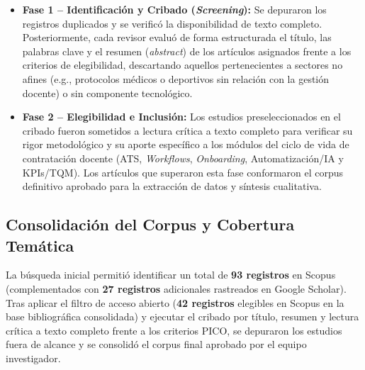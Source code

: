 \documentclass[conference]{IEEEtran}
\begin{document}
\begin{itemize}
    \item \textbf{Fase 1 -- Identificación y Cribado (\textit{Screening}):} Se depuraron los registros duplicados y se verificó la disponibilidad de texto completo. Posteriormente, cada revisor evaluó de forma estructurada el título, las palabras clave y el resumen (\textit{abstract}) de los artículos asignados frente a los criterios de elegibilidad, descartando aquellos pertenecientes a sectores no afines (e.g., protocolos médicos o deportivos sin relación con la gestión docente) o sin componente tecnológico.
    \item \textbf{Fase 2 -- Elegibilidad e Inclusión:} Los estudios preseleccionados en el cribado fueron sometidos a lectura crítica a texto completo para verificar su rigor metodológico y su aporte específico a los módulos del ciclo de vida de contratación docente (ATS, \textit{Workflows}, \textit{Onboarding}, Automatización/IA y KPIs/TQM). Los artículos que superaron esta fase conformaron el corpus definitivo aprobado para la extracción de datos y síntesis cualitativa.
\end{itemize}

\subsection{Consolidación del Corpus y Cobertura Temática}
La búsqueda inicial permitió identificar un total de \textbf{93 registros} en Scopus (complementados con \textbf{27 registros} adicionales rastreados en Google Scholar). Tras aplicar el filtro de acceso abierto (\textbf{42 registros} elegibles en Scopus en la base bibliográfica consolidada) y ejecutar el cribado por título, resumen y lectura crítica a texto completo frente a los criterios PICO, se depuraron los estudios fuera de alcance y se consolidó el corpus final aprobado por el equipo investigador.
\end{document}
